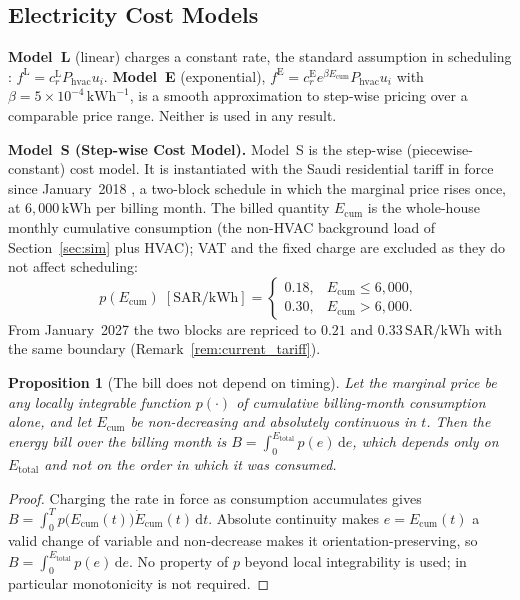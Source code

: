 \documentclass[pdflatex,sn-mathphys-num,iicol]{sn-jnl}
\theoremstyle{thmstyleone}\newtheorem{proposition}{Proposition}\newtheorem{corollary}{Corollary}
\theoremstyle{thmstyletwo}\newtheorem{remark}{Remark}\newtheorem{observation}{Observation}
\theoremstyle{thmstylethree}\newtheorem{definition}{Definition}
\newcommand{\Phvac}{P_{\mathrm{hvac}}}
\newcommand{\SAR}{\text{SAR}}
\newcommand{\kWh}{\text{kWh}}
\begin{document}
\subsection{Electricity Cost Models}
\label{subsec:costmodels}
 
\textbf{Model~L} (linear) charges a constant rate, the standard assumption in scheduling \citep{ElMakroum2023}: $f^{\mathrm{L}}=c_r^{\mathrm{L}}\Phvac u_i$. \textbf{Model~E} (exponential), $f^{\mathrm{E}}=c_r^{\mathrm{E}}e^{\beta E_{\mathrm{cum}}}\Phvac u_i$ with $\beta=5\times10^{-4}\,\text{kWh}^{-1}$, is a smooth approximation to step-wise pricing over a comparable price range. Neither is used in any result.
 
\textbf{Model~S (Step-wise Cost Model).} Model~S is the step-wise (piecewise-constant) cost model. It is instantiated with the Saudi residential tariff in force since January~2018 \citep{SEC2024}, a two-block schedule in which the marginal price rises once, at $6{,}000\,\kWh$ per billing month. The billed quantity $E_{\mathrm{cum}}$ is the whole-house monthly cumulative consumption (the non-HVAC background load of Section~\ref{sec:sim} plus HVAC); VAT and the fixed charge are excluded as they do not affect scheduling:
\begin{equation}
  p(E_{\mathrm{cum}})\;[\SAR/\kWh]=
  \begin{cases}
    0.18, & E_{\mathrm{cum}}\le6{,}000,\\
    0.30, & E_{\mathrm{cum}}>6{,}000.
  \end{cases}
  \label{eq:stepwise}
\end{equation}
From January~2027 the two blocks are repriced to $0.21$ and $0.33\,\SAR/\kWh$ with the same boundary \citep{SaudiEnergy2027} (Remark~\ref{rem:current_tariff}).
\begin{proposition}[The bill does not depend on timing]
\label{prop:path}
Let the marginal price be any locally integrable function $p(\cdot)$ of cumulative billing-month consumption alone, and let $E_{\mathrm{cum}}$ be non-decreasing and absolutely continuous in $t$. Then the energy bill over the billing month is $B=\int_{0}^{E_{\mathrm{total}}}p(e)\,\mathrm{d}e$, which depends only on $E_{\mathrm{total}}$ and not on the order in which it was consumed.
\end{proposition}

\begin{proof}
Charging the rate in force as consumption accumulates gives $B=\int_{0}^{T}p\bigl(E_{\mathrm{cum}}(t)\bigr)\dot{E}_{\mathrm{cum}}(t)\, \mathrm{d}t$. Absolute continuity makes $e=E_{\mathrm{cum}}(t)$ a valid change of variable and non-decrease makes it orientation-preserving, so $B=\int_{0}^{E_{\mathrm{total}}}p(e)\,\mathrm{d}e$. No property of $p$ beyond local integrability is used; in particular monotonicity is not required.
\end{proof}
\end{document}
